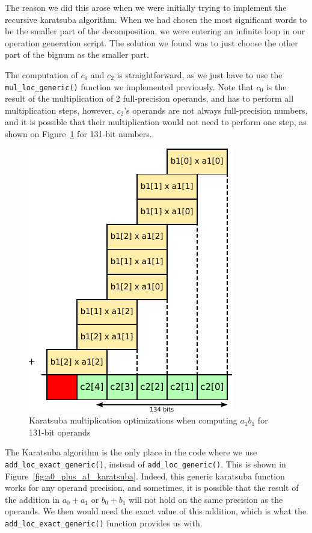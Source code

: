 \documentclass[12pt, a4paper]{report}
\begin{document}
\begin{sloppypar}
The reason we did this arose when we
were initially trying to implement the recursive karatsuba algorithm.
When we had chosen the most significant words to be the smaller part of the
decomposition, we were entering an infinite loop in our operation generation
script.
The solution we found was to just choose the other part of the bignum as the
smaller part.

The computation of $c_0$ and $c_2$ is straightforward, as we just have to use
the \verb+mul_loc_generic()+ function we implemented previously.
Note that $c_0$ is the result of the multiplication of 2 full-precision
operands, and has to perform all multiplication steps, however, $c_2$'s operands
are not always full-precision numbers, and it is possible that their multiplication
would not need to perform one step, as shown on
Figure~\ref{fig:karatsuba_second_level_optimizations} for 131-bit numbers.

\begin{figure}[h]
\centering
\includegraphics[scale=0.8]{figs/karatsuba_second_level_optimizations}
\caption{Karatsuba multiplication optimizations when computing $a_1 b_1$ for 131-bit operands}
\label{fig:karatsuba_second_level_optimizations}
\end{figure}

The Karatsuba algorithm is the only place in the code where we use
\verb+add_loc_exact_generic()+, instead of \verb+add_loc_generic()+.
This is shown in Figure~\ref{fig:a0_plus_a1_karatsuba}.
Indeed, this generic karatsuba function works for any operand precision, and
sometimes, it is possible that the result of the addition in $a_0 + a_1$ or
$b_0 + b_1$ will not hold on the same precision as the operands.
We then would need the exact value of this addition, which is what the
\verb+add_loc_exact_generic()+ function provides us with.


\end{sloppypar}
\end{document}
